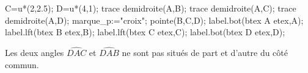 \begin{remarques}
\begin{changemargin}{-10mm}{-10mm}
\begin{minipage}{0.4\linewidth}
\begin{center}
\begin{Geometrie}[CoinHD={(5u,4.3u)}]
               C=u*(2,2.5);
               D=u*(4,1);
               trace demidroite(A,B);
               trace demidroite(A,C);
               trace demidroite(A,D);
               marque_p:="croix";
               pointe(B,C,D);            
               label.bot(btex A etex,A);
               label.lft(btex B etex,B);
               label.lft(btex C etex,C);
               label.bot(btex D etex,D);
            \end{Geometrie}
            \par
            Les deux angles $\widehat{DAC}$ et $\widehat{DAB}$ ne sont pas situés de part et d'autre du côté commun. 
         \end{center}
      \end{minipage}
   \end{changemargin}
\end{remarques}


